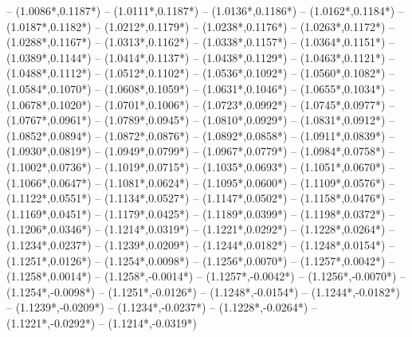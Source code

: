 {	-- ({1.0086*\dx},{0.1187*\dy})
	-- ({1.0111*\dx},{0.1187*\dy})
	-- ({1.0136*\dx},{0.1186*\dy})
	-- ({1.0162*\dx},{0.1184*\dy})
	-- ({1.0187*\dx},{0.1182*\dy})
	-- ({1.0212*\dx},{0.1179*\dy})
	-- ({1.0238*\dx},{0.1176*\dy})
	-- ({1.0263*\dx},{0.1172*\dy})
	-- ({1.0288*\dx},{0.1167*\dy})
	-- ({1.0313*\dx},{0.1162*\dy})
	-- ({1.0338*\dx},{0.1157*\dy})
	-- ({1.0364*\dx},{0.1151*\dy})
	-- ({1.0389*\dx},{0.1144*\dy})
	-- ({1.0414*\dx},{0.1137*\dy})
	-- ({1.0438*\dx},{0.1129*\dy})
	-- ({1.0463*\dx},{0.1121*\dy})
	-- ({1.0488*\dx},{0.1112*\dy})
	-- ({1.0512*\dx},{0.1102*\dy})
	-- ({1.0536*\dx},{0.1092*\dy})
	-- ({1.0560*\dx},{0.1082*\dy})
	-- ({1.0584*\dx},{0.1070*\dy})
	-- ({1.0608*\dx},{0.1059*\dy})
	-- ({1.0631*\dx},{0.1046*\dy})
	-- ({1.0655*\dx},{0.1034*\dy})
	-- ({1.0678*\dx},{0.1020*\dy})
	-- ({1.0701*\dx},{0.1006*\dy})
	-- ({1.0723*\dx},{0.0992*\dy})
	-- ({1.0745*\dx},{0.0977*\dy})
	-- ({1.0767*\dx},{0.0961*\dy})
	-- ({1.0789*\dx},{0.0945*\dy})
	-- ({1.0810*\dx},{0.0929*\dy})
	-- ({1.0831*\dx},{0.0912*\dy})
	-- ({1.0852*\dx},{0.0894*\dy})
	-- ({1.0872*\dx},{0.0876*\dy})
	-- ({1.0892*\dx},{0.0858*\dy})
	-- ({1.0911*\dx},{0.0839*\dy})
	-- ({1.0930*\dx},{0.0819*\dy})
	-- ({1.0949*\dx},{0.0799*\dy})
	-- ({1.0967*\dx},{0.0779*\dy})
	-- ({1.0984*\dx},{0.0758*\dy})
	-- ({1.1002*\dx},{0.0736*\dy})
	-- ({1.1019*\dx},{0.0715*\dy})
	-- ({1.1035*\dx},{0.0693*\dy})
	-- ({1.1051*\dx},{0.0670*\dy})
	-- ({1.1066*\dx},{0.0647*\dy})
	-- ({1.1081*\dx},{0.0624*\dy})
	-- ({1.1095*\dx},{0.0600*\dy})
	-- ({1.1109*\dx},{0.0576*\dy})
	-- ({1.1122*\dx},{0.0551*\dy})
	-- ({1.1134*\dx},{0.0527*\dy})
	-- ({1.1147*\dx},{0.0502*\dy})
	-- ({1.1158*\dx},{0.0476*\dy})
	-- ({1.1169*\dx},{0.0451*\dy})
	-- ({1.1179*\dx},{0.0425*\dy})
	-- ({1.1189*\dx},{0.0399*\dy})
	-- ({1.1198*\dx},{0.0372*\dy})
	-- ({1.1206*\dx},{0.0346*\dy})
	-- ({1.1214*\dx},{0.0319*\dy})
	-- ({1.1221*\dx},{0.0292*\dy})
	-- ({1.1228*\dx},{0.0264*\dy})
	-- ({1.1234*\dx},{0.0237*\dy})
	-- ({1.1239*\dx},{0.0209*\dy})
	-- ({1.1244*\dx},{0.0182*\dy})
	-- ({1.1248*\dx},{0.0154*\dy})
	-- ({1.1251*\dx},{0.0126*\dy})
	-- ({1.1254*\dx},{0.0098*\dy})
	-- ({1.1256*\dx},{0.0070*\dy})
	-- ({1.1257*\dx},{0.0042*\dy})
	-- ({1.1258*\dx},{0.0014*\dy})
	-- ({1.1258*\dx},{-0.0014*\dy})
	-- ({1.1257*\dx},{-0.0042*\dy})
	-- ({1.1256*\dx},{-0.0070*\dy})
	-- ({1.1254*\dx},{-0.0098*\dy})
	-- ({1.1251*\dx},{-0.0126*\dy})
	-- ({1.1248*\dx},{-0.0154*\dy})
	-- ({1.1244*\dx},{-0.0182*\dy})
	-- ({1.1239*\dx},{-0.0209*\dy})
	-- ({1.1234*\dx},{-0.0237*\dy})
	-- ({1.1228*\dx},{-0.0264*\dy})
	-- ({1.1221*\dx},{-0.0292*\dy})
	-- ({1.1214*\dx},{-0.0319*\dy})
}
